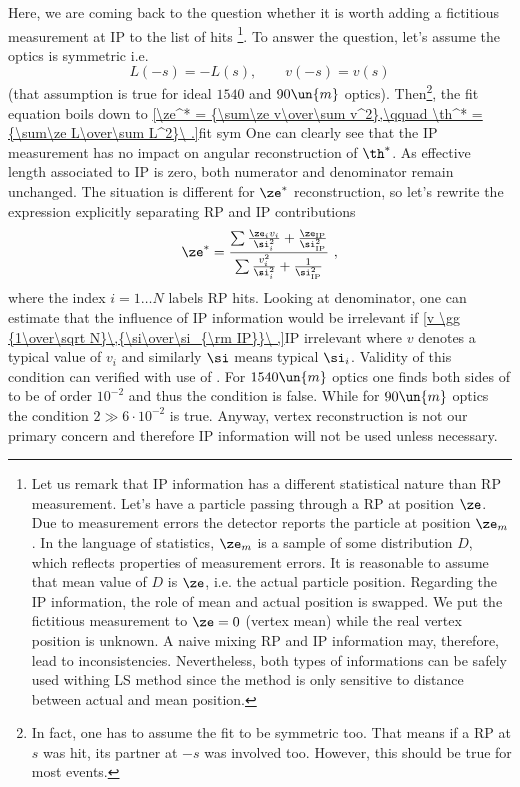 Here, we are coming back to the question whether it is worth adding a fictitious measurement at IP to the list of hits
\footnote{%
Let us remark that IP information has a different statistical nature than RP measurement. Let's have a particle passing through a RP at position $\ze$. Due to measurement errors the detector reports the particle at position $\ze_m$. In the language of statistics, $\ze_m$ is a sample of some distribution $D$, which reflects properties of measurement errors. It is reasonable to assume that mean value of $D$ is $\ze$, i.e. the actual particle position. Regarding the IP information, the role of mean and actual position is swapped. We put the fictitious measurement to $\ze = 0$ (vertex mean) while the real vertex position is unknown. A naive mixing RP and IP information may, therefore, lead to inconsistencies. Nevertheless, both types of informations can be safely used withing LS method since the method is only sensitive to distance between actual and mean position.
}. To answer the question, let's assume the optics is symmetric i.e.
$$L(-s) = - L(s),\qquad v(-s) = v(s)$$
(that assumption is true for ideal $1540$ and $90\un{m}$ optics). Then\footnote{%
In fact, one has to assume the fit to be symmetric too. That means if a RP at $s$ was hit, its partner at $-s$ was involved too. However, this should be true for most events.
}, the fit equation boils down to
\eqref{\ze^* = {\sum\ze v\over\sum v^2},\qquad \th^* = {\sum\ze L\over\sum L^2}\ .}{fit sym}
One can clearly see that the IP measurement has no impact on angular reconstruction of $\th^*$. As effective length associated to IP is zero, both numerator and denominator remain unchanged. The situation is different for $\ze^*$ reconstruction, so let's rewrite the expression explicitly separating RP and IP contributions
$$\ze^* = {\sum{\ze_i v_i\over\si_i^2} + {\ze_{\rm IP}\over \si^2_{\rm IP}}\over \sum {v_i^2\over\si_i^2} + {1\over\si_{\rm IP}^2}}\ ,$$
where the index $i = 1\ldots N$ labels RP hits. Looking at denominator, one can estimate that the influence of IP information would be irrelevant if
\eqref{v \gg {1\over\sqrt N}\,{\si\over\si_{\rm IP}}\ ,}{IP irrelevant}
where $v$ denotes a typical value of $v_i$ and similarly $\si$ means typical $\si_i$. Validity of this condition can verified with use of . For $1540\un{m}$ optics one finds both sides of  to be of order $10^{-2}$ and thus the condition is false. While for $90\un{m}$ optics the condition $2 \gg 6\cdot10^{-2}$ is true. Anyway, vertex reconstruction is not our primary concern and therefore IP information will not be used unless necessary.

